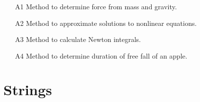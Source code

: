 \begin{enumerate}
\begin{enumerate}
\item[A1] Method to determine force from mass and gravity.
\item[A2] Method to approximate solutions to nonlinear equations.
\item[A3] Method to calculate Newton integrals.
\item[A4] Method to determine duration of free fall of an apple.
\end{enumerate}

\vspace{6mm}

\end{enumerate}


\section{Strings}

